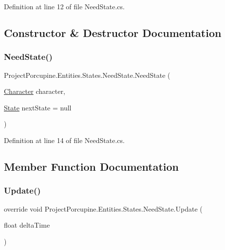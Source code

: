 Definition at line 12 of file Need\+State.\+cs.



\subsection{Constructor \& Destructor Documentation}
\mbox{\label{class_project_porcupine_1_1_entities_1_1_states_1_1_need_state_a1e6ff466a7af17a724663f497736f94c}} 
\subsubsection{\texorpdfstring{Need\+State()}{NeedState()}}
{\footnotesize\ttfamily Project\+Porcupine.\+Entities.\+States.\+Need\+State.\+Need\+State (\begin{DoxyParamCaption}\item[{\hyperlink{class_project_porcupine_1_1_entities_1_1_character}{Character}}]{character,  }\item[{\hyperlink{class_project_porcupine_1_1_entities_1_1_states_1_1_state}{State}}]{next\+State = {\ttfamily null} }\end{DoxyParamCaption})}



Definition at line 14 of file Need\+State.\+cs.



\subsection{Member Function Documentation}
\mbox{\label{class_project_porcupine_1_1_entities_1_1_states_1_1_need_state_a7719ba9d0ec106d384cb84f40e89b885}} 
\subsubsection{\texorpdfstring{Update()}{Update()}}
{\footnotesize\ttfamily override void Project\+Porcupine.\+Entities.\+States.\+Need\+State.\+Update (\begin{DoxyParamCaption}\item[{float}]{delta\+Time }\end{DoxyParamCaption})\hspace{0.3cm}{\ttfamily [virtual]}}



